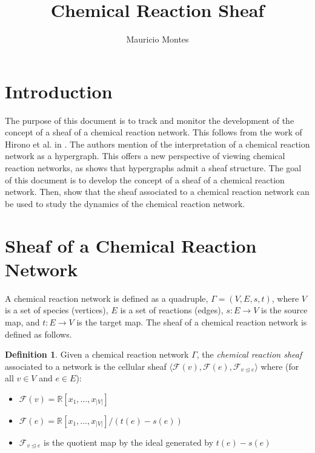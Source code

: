 \documentclass[12pt]{article}
\author{Mauricio Montes}
\title{Chemical Reaction Sheaf}
\theoremstyle{definition}
\newtheorem{definition}{Definition}
\newcommand{\F}{\mathcal{F}}
\newcommand{\<}{\langle}
\renewcommand{\>}{\rangle}
\begin{document}
\maketitle

\section{Introduction}

The purpose of this document is to track and monitor the development of the concept of
a sheaf of a chemical reaction network. This follows from the work of Hirono et al. in 
\cite{Hirono2021}. The authors mention of the interpretation of a chemical reaction network
as a hypergraph. This offers a new perspective of viewing chemical reaction networks, as 
\cite{duta2023sheaf} shows that hypergraphs admit a sheaf structure. The goal of this document
is to develop the concept of a sheaf of a chemical reaction network. Then, show that the 
sheaf associated to a chemical reaction network can be used to study the dynamics of the
chemical reaction network.



\section{Sheaf of a Chemical Reaction Network}

A chemical reaction network is defined as a quadruple, $\Gamma = (V, E, s, t)$, where $V$ is a set of
species (vertices), $E$ is a set of reactions (edges), $s: E \to V$ is the source map, and
$t: E \to V$ is the target map. The sheaf of a chemical reaction network is defined as follows.

\begin{definition} Given a chemical reaction network $\Gamma$, the \textit{chemical reaction sheaf} associated to a 
network is the cellular sheaf $ \< \F(v) , \F(e), \F_{v \trianglelefteq e} \>$ where
(for all $v \in V $ and $e \in E$):

\begin{itemize}
  \item $\F(v) = \mathbb{R}[x_1, \ldots, x_{|V|}]$
  \item $\F(e) = \mathbb{R}[x_1, \ldots, x_{|V|}] / (t(e) - s(e))$
  \item $\F_{v \trianglelefteq e}$ is the quotient map by the ideal generated
    by $t(e) - s(e)$
\end{itemize}
\end{definition}
\end{document}
